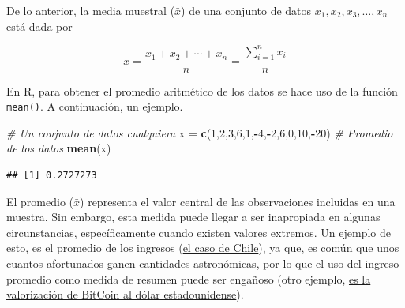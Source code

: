 \documentclass[
  11pt,
]{book}
\newenvironment{Shaded}{\begin{snugshade}}{\end{snugshade}}
\newcommand{\CommentTok}[1]{\textcolor[rgb]{0.56,0.35,0.01}{\textit{#1}}}
\newcommand{\DecValTok}[1]{\textcolor[rgb]{0.00,0.00,0.81}{#1}}
\newcommand{\FunctionTok}[1]{\textcolor[rgb]{0.13,0.29,0.53}{\textbf{#1}}}
\newcommand{\NormalTok}[1]{#1}
\newcommand{\OtherTok}[1]{\textcolor[rgb]{0.56,0.35,0.01}{#1}}
\newcommand{\SpecialCharTok}[1]{\textcolor[rgb]{0.81,0.36,0.00}{\textbf{#1}}}
\theoremstyle{definition}
\theoremstyle{definition}
\theoremstyle{definition}
\theoremstyle{definition}
\theoremstyle{remark}
\begin{document}
De lo anterior, la media muestral (\(\bar{x}\)) de una conjunto de datos \(x_1, x_2, x_3, \ldots, x_n\) está dada por \citep[página 25]{Devore}

\begin{equation}
\bar{x} = \frac{x_1 + x_2 + \cdots + x_n}{n} = \frac{\displaystyle\sum_{i=1}^{n}x_i}{n}
\label{eq:promedio}
\end{equation}

En R, para obtener el promedio aritmético de los datos se hace uso de la función \texttt{mean()}. A continuación, un ejemplo.

\begin{Shaded}
\begin{Highlighting}[]
\CommentTok{\# Un conjunto de datos cualquiera}
\NormalTok{x }\OtherTok{=} \FunctionTok{c}\NormalTok{(}\DecValTok{1}\NormalTok{,}\DecValTok{2}\NormalTok{,}\DecValTok{3}\NormalTok{,}\DecValTok{6}\NormalTok{,}\DecValTok{1}\NormalTok{,}\SpecialCharTok{{-}}\DecValTok{4}\NormalTok{,}\SpecialCharTok{{-}}\DecValTok{2}\NormalTok{,}\DecValTok{6}\NormalTok{,}\DecValTok{0}\NormalTok{,}\DecValTok{10}\NormalTok{,}\SpecialCharTok{{-}}\DecValTok{20}\NormalTok{)}
\CommentTok{\# Promedio de los datos}
\FunctionTok{mean}\NormalTok{(x)}
\end{Highlighting}
\end{Shaded}

\begin{verbatim}
## [1] 0.2727273
\end{verbatim}

El promedio (\(\bar{x}\)) representa el valor central de las observaciones incluidas en una muestra. Sin embargo, esta medida puede llegar a ser inapropiada en algunas circunstancias, específicamente cuando existen valores extremos. Un ejemplo de esto, es el promedio de los ingresos (\href{https://www.ine.gob.cl/prensa/detalle-prensa/2022/07/21/el-ingreso-laboral-promedio-mensual-en-chile-fue-de-$681.039-en-2021\#:~:text=El\%20ingreso\%20laboral\%20promedio\%20mensual\%20en\%20Chile\%20fue\%20de\%20\%24681.039\%20en\%202021,-21\%2F07\%2F2022&text=El\%2050\%25\%20de\%20las\%20personas,ingreso\%20de\%20hasta\%20\%24457.690\%20mensuales.}{el caso de Chile}), ya que, es común que unos cuantos afortunados ganen cantidades astronómicas, por lo que el uso del ingreso promedio como medida de resumen puede ser engañoso (otro ejemplo, \href{https://www.google.com/finance/quote/BTC-USD?sa=X&ved=2ahUKEwi3po-_m9n8AhWUL7kGHTNFCfYQ-fUHegQIFhAe&window=MAX}{es la valorización de BitCoin al dólar estadounidense}).
\end{document}
